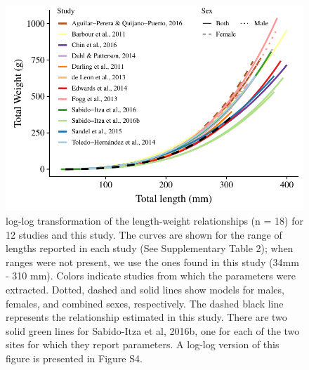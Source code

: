 \documentclass[fleqn,10pt,lineno]{wlpeerj} %
\begin{document}
\begin{figure}
\centering
\includegraphics{Manuscript_files/figure-latex/fit2-1.pdf}
\caption{\label{fig:all_allo}log-log transformation of the length-weight
relationships (n = 18) for 12 studies and this study. The curves are
shown for the range of lengths reported in each study (See Supplementary
Table 2); when ranges were not present, we use the ones found in this
study (34mm - 310 mm). Colors indicate studies from which the parameters
were extracted. Dotted, dashed and solid lines show models for males,
females, and combined sexes, respectively. The dashed black line
represents the relationship estimated in this study. There are two solid
green lines for Sabido-Itza et al, 2016b, one for each of the two sites
for which they report parameters. A log-log version of this figure is
presented in Figure S4.}
\end{figure}
\end{document}
